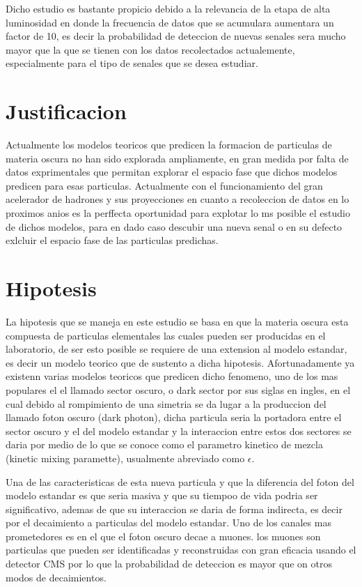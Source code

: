Dicho estudio es bastante propicio debido a la relevancia de la etapa de alta luminosidad en donde la frecuencia de datos que se acumulara aumentara un factor de 10, es decir la probabilidad de deteccion de nuevas senales sera mucho mayor que la que se tienen con los datos recolectados actualemente, especialmente para el tipo de senales que se desea estudiar. 


\chapter{Justificacion}

Actualmente los modelos teoricos que predicen la formacion de particulas de materia oscura no han sido explorada ampliamente, en gran medida por falta de datos exprimentales que permitan explorar el espacio fase que dichos modelos predicen para esas particulas.  Actualmente con el funcionamiento del gran acelerador de hadrones y sus proyecciones en cuanto a recoleccion de datos en lo proximos anios es la perffecta oportunidad para explotar lo ms posible el estudio de dichos modelos, para en dado caso descubir una nueva senal o en su defecto exlcluir el espacio fase de las particulas predichas. 

\chapter{Hipotesis}

La hipotesis que se maneja en este estudio se basa en que la materia oscura esta compuesta de particulas elementales las cuales pueden ser producidas en el laboratorio, de ser esto posible se requiere de una extension al modelo estandar, es decir un modelo teorico que de sustento a dicha hipotesis. Afortunadamente ya existenn varias modelos teoricos que predicen dicho fenomeno, uno de los mas populares el el llamado sector oscuro, o dark sector por sus siglas en ingles, en el cual debido al rompimiento de una simetria se da lugar a la produccion del llamado foton oscuro (dark photon), dicha particula seria la portadora entre el sector oscuro y el del modelo estandar y la interaccion entre estos dos sectores se daria por medio de lo que se conoce como el parametro kinetico de mezcla (kinetic mixing paramette), usualmente abreviado como $\epsilon$. 

Una de las caracteristicas de esta nueva particula y que la diferencia del foton del modelo estandar es que seria masiva y que su tiempoo de vida podria ser significativo, ademas de que su interaccion se daria de forma indirecta, es decir por el decaimiento a particulas del modelo estandar.  Uno de los canales mas prometedores es en el que el foton oscuro decae a muones. los muones son particulas que pueden ser identificadas y reconstruidas con gran eficacia usando el detector CMS por lo que la probabilidad de deteccion es mayor que on otros modos de decaimientos.

